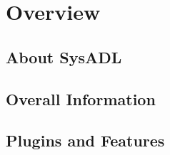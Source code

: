 \chapter{Overview}
\section{About SysADL}
\section{Overall Information}
\section{Plugins and Features}
